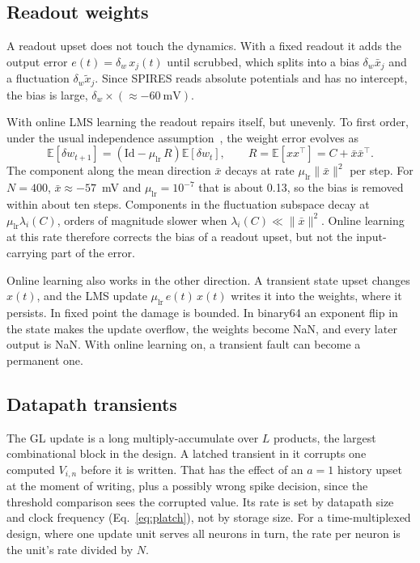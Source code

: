 \documentclass[11pt,a4paper]{article}
\newcommand{\E}{\mathbb{E}}
\begin{document}
\subsection{Readout weights}
\label{sec:readout}

A readout upset does not touch the dynamics. With a fixed readout it adds the output error $e(t) = \delta_w\, x_j(t)$ until scrubbed, which splits into a bias $\delta_w \bar x_j$ and a fluctuation $\delta_w \tilde x_j$. Since SPIRES reads absolute potentials and has no intercept, the bias is large, $\delta_w \times (\approx -60~\mathrm{mV})$.

With online LMS learning the readout repairs itself, but unevenly. To first order, under the usual independence assumption~\cite{widrow1985}, the weight error evolves as
\begin{equation}
\E[\delta w_{t+1}] = \left( \mathrm{Id} - \mu_{\mathrm{lr}}\, R \right) \E[\delta w_t], \qquad R = \E[x x^{\top}] = C + \bar x \bar x^{\top}.
\end{equation}
The component along the mean direction $\bar x$ decays at rate $\mu_{\mathrm{lr}}\|\bar x\|^2$ per step. For $N = 400$, $\bar x \approx -57$~mV and $\mu_{\mathrm{lr}} = 10^{-7}$ that is about 0.13, so the bias is removed within about ten steps. Components in the fluctuation subspace decay at $\mu_{\mathrm{lr}} \lambda_i(C)$, orders of magnitude slower when $\lambda_i(C) \ll \|\bar x\|^2$. Online learning at this rate therefore corrects the bias of a readout upset, but not the input-carrying part of the error.

Online learning also works in the other direction. A transient state upset changes $x(t)$, and the LMS update $\mu_{\mathrm{lr}}\, e(t)\, x(t)$ writes it into the weights, where it persists. In fixed point the damage is bounded. In binary64 an exponent flip in the state makes the update overflow, the weights become NaN, and every later output is NaN. With online learning on, a transient fault can become a permanent one.

\subsection{Datapath transients}
\label{sec:set}

The GL update is a long multiply-accumulate over $L$ products, the largest combinational block in the design. A latched transient in it corrupts one computed $V_{i,n}$ before it is written. That has the effect of an $a = 1$ history upset at the moment of writing, plus a possibly wrong spike decision, since the threshold comparison sees the corrupted value. Its rate is set by datapath size and clock frequency (Eq.~\eqref{eq:platch}), not by storage size. For a time-multiplexed design, where one update unit serves all neurons in turn, the rate per neuron is the unit's rate divided by $N$.
\end{document}
